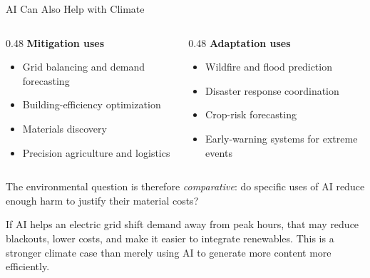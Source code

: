 \documentclass[aspectratio=169,11pt]{beamer}
\begin{document}
\begin{frame}{AI Can Also Help with Climate}
\begin{columns}[T]
\begin{column}{0.48\textwidth}
\textbf{Mitigation uses}
\begin{itemize}
    \item Grid balancing and demand forecasting
    \item Building-efficiency optimization
    \item Materials discovery
    \item Precision agriculture and logistics
\end{itemize}
\end{column}
\begin{column}{0.48\textwidth}
\textbf{Adaptation uses}
\begin{itemize}
    \item Wildfire and flood prediction
    \item Disaster response coordination
    \item Crop-risk forecasting
    \item Early-warning systems for extreme events
\end{itemize}
\end{column}
\end{columns}

\vspace{0.2cm}
The environmental question is therefore \emph{comparative}: do specific uses of AI reduce enough harm to justify their material costs?

\vspace{0.2cm}
\begin{casestudybox}[Example]
\scriptsize
If AI helps an electric grid shift demand away from peak hours, that may reduce blackouts, lower costs, and make it easier to integrate renewables. This is a stronger climate case than merely using AI to generate more content more efficiently.
\end{casestudybox}
\end{frame}
\end{document}

